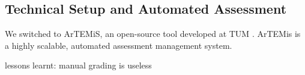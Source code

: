 \subsection{Technical Setup and Automated Assessment}\label{sec:tech_setup_test}

We switched to ArTEMiS, an open-source tool developed at TUM \citep{artemis}.
ArTEMis is a highly scalable,
automated assessment management system.

lessons learnt: manual grading is useless
